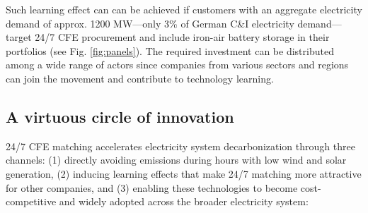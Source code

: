 \documentclass[pdflatex,sn-basic, Numbered]{sn-jnl}%
\theoremstyle{thmstyleone}%
\theoremstyle{thmstyletwo}%
\theoremstyle{thmstylethree}%
\begin{document}
Such learning effect can can be achieved if customers with an aggregate electricity demand of approx. 1200 MW---only 3\% of German C\&I electricity demand---target 24/7 CFE procurement and include iron-air battery storage in their portfolios (see Fig. \ref{fig:panels}). The required investment can be distributed among a wide range of actors since companies from various sectors and regions can join the movement and contribute to technology learning.

\subsection*{A virtuous circle of innovation}\label{sec5}

24/7 CFE matching accelerates electricity system decarbonization through three channels: (1) directly avoiding emissions during hours with low wind and solar generation, (2) inducing learning effects that make 24/7 matching more attractive for other companies, and (3) enabling these technologies to become cost-competitive and widely adopted across the broader electricity system:
\end{document}
